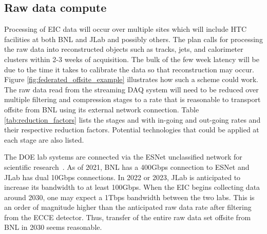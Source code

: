 \subsection{Raw data compute}
Processing of EIC data will occur over multiple sites which will include HTC facilities at both BNL and JLab and possibly others. The plan calls for processing the raw data into reconstructed objects such as tracks, jets, and calorimeter clusters within 2-3 weeks of acquisition. The bulk of the few week latency will be due to the time it takes to calibrate the data so that reconstruction may occur. Figure \ref{fig:federated_offsite_example} illustrates how such a scheme could work. The raw data read from the streaming DAQ system will need to be reduced over multiple filtering and compression stages to a rate that is reasonable to transport offsite from BNL using its external network connection. Table \ref{tab:reduction_factors} lists the stages and with in-going and out-going rates and their respective reduction factors. Potential technologies that could be applied at each stage are also listed.

The DOE lab systems are connected via the ESNet unclassified network for scientific research~\cite{ESNet}. As of 2021, BNL has a 400Gbps connection to ESNet and JLab has dual 10Gbps connections. In 2022 or 2023, JLab is anticipated to increase its bandwidth to at least 100Gbps. When the EIC begins collecting data around 2030, one may expect a 1Tbps bandwidth between the two labs. This is an order of magnitude higher than the anticipated raw data rate after filtering from the ECCE detector. Thus, transfer of the entire raw data set offsite from BNL in 2030 seems reasonable.


